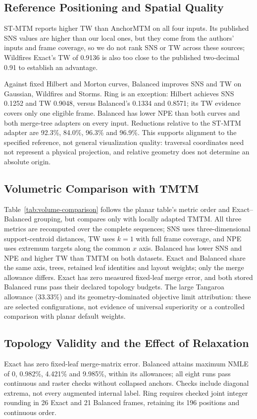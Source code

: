 \documentclass{vgtc}                %
\begin{document}
\subsection{Reference Positioning and Spatial Quality}

ST-MTM reports higher TW than AnchorMTM on all four inputs. Its published SNS values are higher than our local ones, but they come from the authors' inputs and frame coverage, so we do not rank SNS or TW across these sources; Wildfires Exact's TW of 0.9136 is also too close to the published two-decimal 0.91 to establish an advantage.

Against fixed Hilbert and Morton curves, Balanced improves SNS and TW on Gaussian, Wildfires and Storms. Ring is an exception: Hilbert achieves SNS 0.1252 and TW 0.9048, versus Balanced's 0.1334 and 0.8571; its TW evidence covers only one eligible frame. Balanced has lower NPE than both curves and both merge-tree adapters on every input. Reductions relative to the ST-MTM adapter are 92.3\%, 84.0\%, 96.3\% and 96.9\%. This supports alignment to the specified reference, not general visualization quality: traversal coordinates need not represent a physical projection, and relative geometry does not determine an absolute origin.

\subsection{Volumetric Comparison with TMTM}

Table~\ref{tab:volume-comparison} follows the planar table's metric order and Exact--Balanced grouping, but compares only with locally adapted TMTM. All three metrics are recomputed over the complete sequences; SNS uses three-dimensional support-centroid distances, TW uses $k=1$ with full frame coverage, and NPE uses extremum targets along the common $x$ axis. Balanced has lower SNS and NPE and higher TW than TMTM on both datasets. Exact and Balanced share the same axis, trees, retained leaf identities and layout weights; only the merge allowance differs. Exact has zero measured fixed-leaf merge error, and both stored Balanced runs pass their declared topology budgets. The large Tangaroa allowance (33.33\%) and its geometry-dominated objective limit attribution: these are selected configurations, not evidence of universal superiority or a controlled comparison with planar default weights.

\subsection{Topology Validity and the Effect of Relaxation}
Exact has zero fixed-leaf merge-matrix error. Balanced attains maximum NMLE of 0, 0.982\%, 4.421\% and 9.985\%, within its allowances; all eight runs pass continuous and raster checks without collapsed anchors. Checks include diagonal extrema, not every augmented internal label. Ring requires checked joint integer rounding in 26 Exact and 21 Balanced frames, retaining its 196 positions and continuous order.
\end{document}
